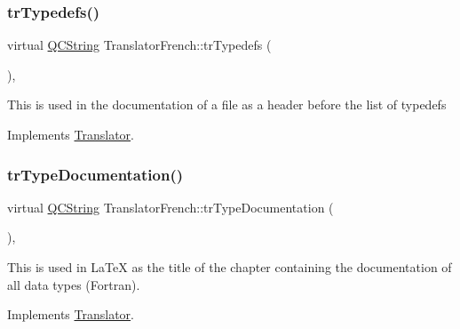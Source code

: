 \mbox{\label{class_translator_french_a15e8fc7de0fa5ace5e025d98898a6b25}} 
\subsubsection{\texorpdfstring{trTypedefs()}{trTypedefs()}}
{\footnotesize\ttfamily virtual \mbox{\hyperlink{class_q_c_string}{Q\+C\+String}} Translator\+French\+::tr\+Typedefs (\begin{DoxyParamCaption}{ }\end{DoxyParamCaption})\hspace{0.3cm}{\ttfamily [inline]}, {\ttfamily [virtual]}}

This is used in the documentation of a file as a header before the list of typedefs 

Implements \mbox{\hyperlink{class_translator}{Translator}}.

\mbox{\label{class_translator_french_ac79919fef3924220f9096a7ea8145aaa}} 
\subsubsection{\texorpdfstring{trTypeDocumentation()}{trTypeDocumentation()}}
{\footnotesize\ttfamily virtual \mbox{\hyperlink{class_q_c_string}{Q\+C\+String}} Translator\+French\+::tr\+Type\+Documentation (\begin{DoxyParamCaption}{ }\end{DoxyParamCaption})\hspace{0.3cm}{\ttfamily [inline]}, {\ttfamily [virtual]}}

This is used in La\+TeX as the title of the chapter containing the documentation of all data types (Fortran). 

Implements \mbox{\hyperlink{class_translator}{Translator}}.

\mbox{\label{class_translator_french_afb7147d5489aae7dd983797c982bca33}} 
